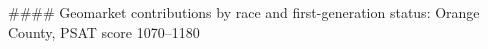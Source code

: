 #### Geomarket contributions by race and first-generation status: Orange County, PSAT score 1070–1180

